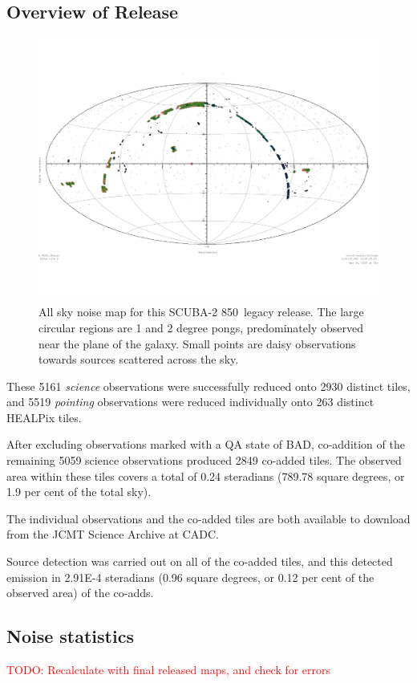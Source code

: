 \documentclass[usenatbib]{mnras}
\newcommand{\um}{\micron}
\newcommand{\todo}[1]{\textcolor{red}{TODO: #1}}
\newcommand{\status}[1]{\textsf{#1}}
\begin{document}
\subsection{Overview of Release}

\begin{figure}
  \centering
  \includegraphics[width=0.9\linewidth]{legacy850-noise-aitoff}
  \caption{All sky noise map for this SCUBA-2 850\,\um{} legacy
    release. The large circular regions are 1 and 2 degree pongs,
    predominately observed near the plane of the galaxy. Small points
    are daisy observations towards sources scattered across the
    sky.}
  \label{fig:noise-aitoff}
\end{figure}

These 5161 \emph{science} observations were successfully reduced onto
2930 distinct tiles, and 5519 \emph{pointing} observations were
reduced individually onto 263 distinct HEALPix tiles.

After excluding observations marked with a QA state of \status{BAD},
co-addition of the remaining 5059 science observations produced 2849
co-added tiles. The observed area within these tiles covers a total of
0.24 steradians (789.78 square degrees, or 1.9 per cent of the total
sky).

The individual observations and the co-added tiles are both available
to download from the JCMT Science Archive at CADC.

Source detection was carried out on all of the co-added tiles, and this
detected emission in 2.91E-4 steradians (0.96 square degrees, or 0.12
per cent of the observed area) of the co-adds.

\subsection{Noise statistics}
\todo{Recalculate with final released maps, and check for errors}
\end{document}
